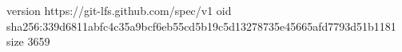 version https://git-lfs.github.com/spec/v1
oid sha256:339d6811abfc4c35a9bcf6eb55cd5b19c5d13278735e45665afd7793d51b1181
size 3659

